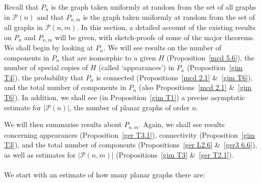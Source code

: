 \documentclass{article}
\newtheorem{Proof of Theorem}{Proof of Theorem}
\begin{document}
Recall that $P_{n}$ is the graph taken uniformly at random from the set of all graphs in $\mathcal{P}(n)$
and that $P_{n,m}$ is the graph taken uniformly at random from the set of all graphs in $\mathcal{P}(n,m)$.
In this section, 
a detailed account of the existing results on $P_{n}$ and $P_{n,m}$ will be given,
with sketch-proofs of some of the major theorems. \\

We shall begin by looking at $P_{n}$.
We will see results on the number of components in $P_{n}$ that are isomorphic to a given $H$ (Proposition~\ref{mcd 5.6}),
the number of special copies of $H$ (called `appearances') in $P_{n}$ (Proposition~\ref{gim T4}),
the probability that $P_{n}$ is connected (Propositions~\ref{mcd 2.1} \&~\ref{gim T6}),
and the total number of components in $P_{n}$ (also Propositions~\ref{mcd 2.1} \&~\ref{gim T6}).
In addition, 
we shall see (in Proposition~\ref{gim T1}) a precise asymptotic estimate for $|\mathcal{P}(n)|$,
the number of planar graphs of order $n$.

We will then summarise results about $P_{n,m}$.
Again, we shall see results concerning appearances (Proposition~\ref{ger T3.1}),
connectivity (Proposition~\ref{gim T3}),
and the total number of components (Propositions~\ref{ger L2.6} \&~\ref{ger3 6.6}),
as well as estimates for $|\mathcal{P}(n,m)|$ (Propositions~\ref{gim T3} \&~\ref{ger T2.1}). 
\begin{displaymath}
\end{displaymath} \\















We start with an estimate of how many planar graphs there are:
\end{document}
